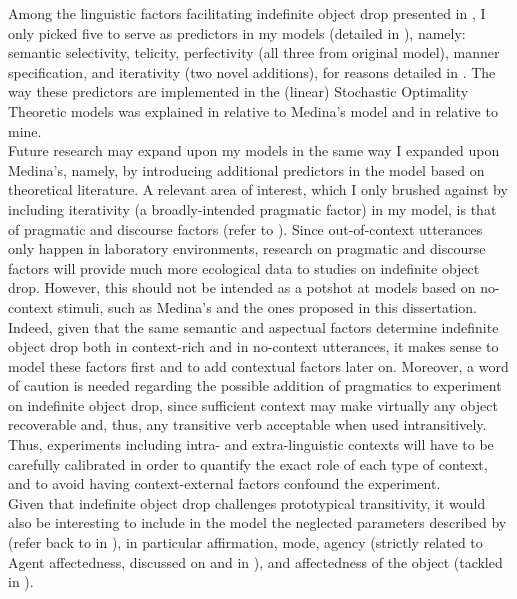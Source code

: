Among the linguistic factors facilitating indefinite object drop presented in , I only picked five to serve as predictors in my models (detailed in ), namely: semantic selectivity, telicity, perfectivity (all three from  original model), manner specification, and iterativity (two novel additions), for reasons detailed in . The way these predictors are implemented in the (linear) Stochastic Optimality Theoretic models was explained in  relative to Medina's model and in  relative to mine.\\
Future research may expand upon my models in the same way I expanded upon Medina's, namely, by introducing additional predictors in the model based on theoretical literature. A relevant area of interest, which I only brushed against by including iterativity (a broadly-intended pragmatic factor) in my model, is that of pragmatic and discourse factors (refer to ). Since out-of-context utterances only happen in laboratory environments, research on pragmatic and discourse factors will provide much more ecological data to studies on indefinite object drop. However, this should not be intended as a potshot at models based on no-context stimuli, such as Medina's and the ones proposed in this dissertation. Indeed, given that the same semantic and aspectual factors determine indefinite object drop both in context-rich and in no-context utterances, it makes sense to model these factors first and to add contextual factors later on. Moreover, a word of caution is needed regarding the possible addition of pragmatics to experiment on indefinite object drop, since sufficient context may make virtually any object recoverable and, thus, any transitive verb acceptable when used intransitively. Thus, experiments including intra- and extra-linguistic contexts will have to be carefully calibrated in order to quantify the exact role of each type of context, and to avoid having context-external factors confound the experiment.\\
Given that indefinite object drop challenges prototypical transitivity, it would also be interesting to include in the model the neglected parameters described by \textcite{HopperThompson1980} (refer back to  in ), in particular affirmation, mode, agency (strictly related to Agent affectedness, discussed on  and in ), and affectedness of the object (tackled in ).

